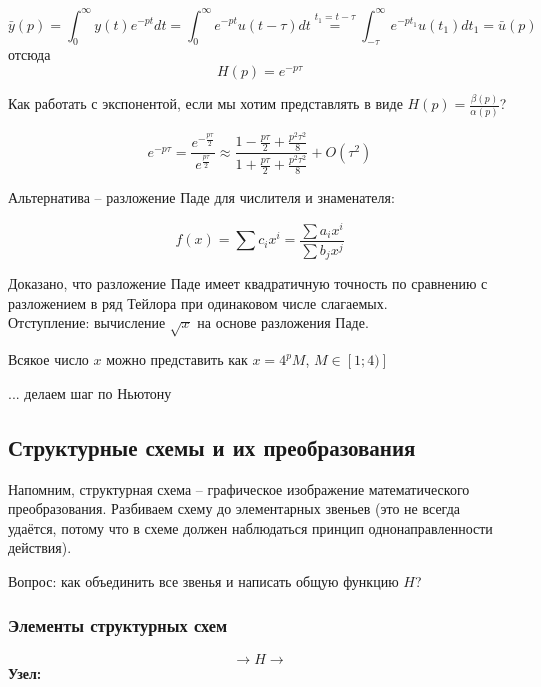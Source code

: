 \documentclass[main.tex]{subfiles}
\begin{document}
\begin{enumerate}[noitemsep]
    $$ \bar y(p) = \int_{0}^{\infty} y(t)e^{-pt}dt = \int_{0}^{\infty} e^{-pt}u(t-\tau) dt \overset{t_1=t-\tau}= \int_{-\tau}^{\infty}e^{-pt_1}u(t_1)dt_1 = \bar u(p)  $$
    отсюда
    $$ \boxed{H(p)=e^{-p\tau}} $$

    Как работать с экспонентой, если мы хотим представлять в виде $ H(p) = \frac{\beta(p)}{\alpha(p)} $?

    $$ e^{-p\tau} = \frac{e^{-\frac{p\tau}{2}}}{e^{\frac{p\tau}{2}}} \approx \frac{1 - \frac{p\tau}{2} + \frac{p^2\tau^2}{8}}{1 + \frac{p\tau}{2} + \frac{p^2\tau^2}{8}} + O(\tau^2) $$ %

    Альтернатива -- разложение Паде для числителя и знаменателя:

    $$ f(x) = \sum c_ix^i = \frac{\sum a_i x^i}{\sum b_j x^j} $$

    Доказано, что разложение Паде имеет квадратичную точность по сравнению с разложением в ряд Тейлора при одинаковом числе слагаемых.\\

    Отступление: вычисление $ \sqrt x $ на основе разложения Паде.

    Всякое число $ x $ можно представить как $ x = 4^pM $, $M \in [1;4)]$

    ... делаем шаг по Ньютону





\end{enumerate}

\subsection{Структурные схемы и их преобразования}

Напомним, структурная схема -- графическое изображение математического преобразования.
Разбиваем схему до элементарных звеньев (это не всегда удаётся, потому что в схеме должен наблюдаться принцип однонаправленности действия).

Вопрос: как объединить все звенья и написать общую функцию $ H $?

\subsubsection{Элементы структурных схем}

$$ \rightarrow \boxed{H} \rightarrow $$
\textbf{Узел:} %
\end{document}
